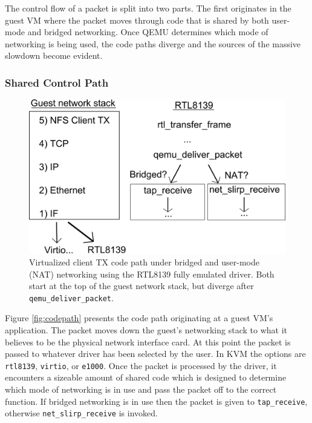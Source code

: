 The control flow of a packet is split into two parts.
The first originates in the guest VM where the packet moves through code that is shared by both user-mode and bridged networking.
Once QEMU determines which mode of networking is being used, the code paths diverge and the sources of the massive slowdown become evident.

\subsubsection{Shared Control Path}
\begin{figure}[!ht]
	\centering
		\includegraphics[scale=0.6]{codepath1}
	\caption{Virtualized client TX code path under bridged and user-mode (NAT) networking using the RTL8139 fully emulated driver. Both start at the top of the guest network stack, but diverge after \texttt{qemu\_deliver\_packet}.}
	\label{fig:codepath1}
\end{figure}

Figure \ref{fig:codepath} presents the code path originating at a guest VM's application.
The packet moves down the guest's networking stack to what it believes to be the physical network interface card.
At this point the packet is passed to whatever driver has been selected by the user.
In KVM the options are \texttt{rtl8139}, \texttt{virtio}, or \texttt{e1000}.
Once the packet is processed by the driver, it encounters a sizeable amount of shared code which is designed to determine which mode of networking is in use and pass the packet off to the
correct function.
If bridged networking is in use then the packet is given to \texttt{tap\_receive}, otherwise \texttt{net\_slirp\_receive} is invoked.

